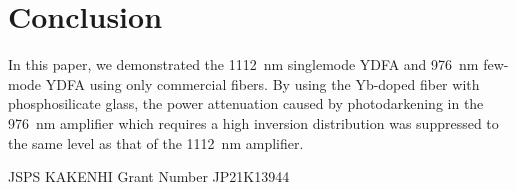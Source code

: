 \documentclass{osa-article}
\begin{document}
\section{Conclusion}
In this paper, we demonstrated the \SI{1112}{\nm} singlemode YDFA and \SI{976}{\nm} few-mode YDFA using only commercial fibers.
By using the Yb-doped fiber with phosphosilicate glass, the power attenuation caused by photodarkening in the \SI{976}{\nm} amplifier which requires a high inversion distribution was suppressed to the same level as that of the \SI{1112}{\nm} amplifier.


\begin{backmatter}

JSPS KAKENHI Grant Number JP21K13944



\end{backmatter}








\end{document}
